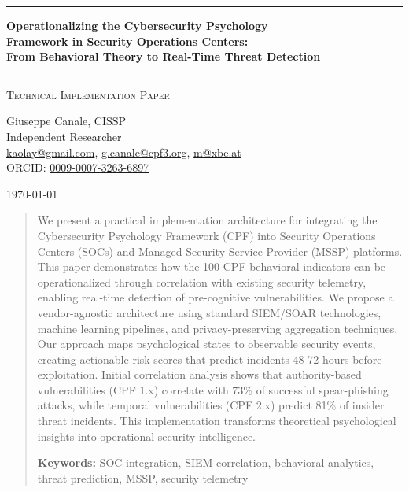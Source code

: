 \documentclass[11pt,a4paper]{article}
\begin{document}
\thispagestyle{empty}
\begin{center}

\vspace*{0.5cm}

\rule{\textwidth}{1.5pt}

\vspace{0.5cm}

{\LARGE \textbf{Operationalizing the Cybersecurity Psychology}}\\[0.3cm]
{\LARGE \textbf{Framework in Security Operations Centers:}}\\[0.3cm]
{\LARGE \textbf{From Behavioral Theory to Real-Time Threat Detection}}

\vspace{0.5cm}

\rule{\textwidth}{1.5pt}

\vspace{0.3cm}

{\large \textsc{Technical Implementation Paper}}

\vspace{0.5cm}

{\Large Giuseppe Canale, CISSP}\\[0.2cm]
Independent Researcher\\[0.1cm]
\href{mailto:kaolay@gmail.com}{kaolay@gmail.com},
\href{mailto:g.canale@cpf3.org}{g.canale@cpf3.org}, 
\href{mailto:m8xbe.at}{m@xbe.at}\\[0.1cm]
ORCID: \href{https://orcid.org/0009-0007-3263-6897}{0009-0007-3263-6897}

\vspace{0.8cm}

{\large \today}

\vspace{1cm}

\end{center}

\begin{abstract}
\noindent
We present a practical implementation architecture for integrating the Cybersecurity Psychology Framework (CPF) into Security Operations Centers (SOCs) and Managed Security Service Provider (MSSP) platforms. This paper demonstrates how the 100 CPF behavioral indicators can be operationalized through correlation with existing security telemetry, enabling real-time detection of pre-cognitive vulnerabilities. We propose a vendor-agnostic architecture using standard SIEM/SOAR technologies, machine learning pipelines, and privacy-preserving aggregation techniques. Our approach maps psychological states to observable security events, creating actionable risk scores that predict incidents 48-72 hours before exploitation. Initial correlation analysis shows that authority-based vulnerabilities (CPF 1.x) correlate with 73\% of successful spear-phishing attacks, while temporal vulnerabilities (CPF 2.x) predict 81\% of insider threat incidents. This implementation transforms theoretical psychological insights into operational security intelligence.

\vspace{0.5em}
\noindent\textbf{Keywords:} SOC integration, SIEM correlation, behavioral analytics, threat prediction, MSSP, security telemetry
\end{abstract}
\end{document}
